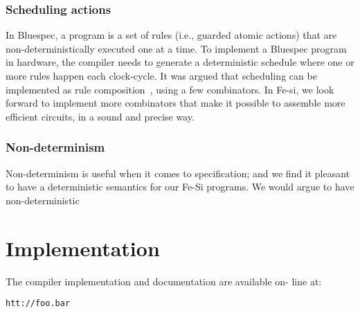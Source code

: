 \documentclass{llncs}
\begin{document}
\subsubsection{Scheduling actions}
In Bluespec, a program is a set of rules (i.e., guarded atomic
actions) that are non-deterministically executed one at a time. To
implement a Bluespec program in hardware, the compiler needs to
generate a deterministic schedule where one or more rules happen each
clock-cycle. 
%
It was argued that scheduling can be implemented as rule
composition~\cite{DBLP:conf/memocode/DaveAP07}, using a few
combinators. 
%
In Fe-si, we look forward to implement more combinators that make it
possible to assemble more efficient circuits, in a sound and precise
way.
%

\subsubsection{Non-determinism}
Non-determinism is useful when it comes to specification; and we find
it pleasant to have a deterministic semantics for our Fe-Si
programs. We would argue to have non-deterministic

\section{Implementation}
The compiler implementation and documentation are available on- line
at: 
%
\begin{center}
  \texttt{htt://foo.bar}
\end{center}





\end{document}
